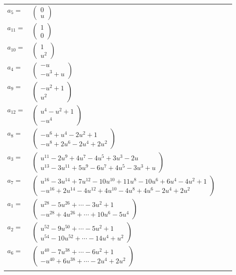 \documentclass[1p]{elsarticle_modified}
\theoremstyle{definition}
\begin{document}
\begin{tabular}{m{7pt} m{180pt} m{7pt} m{180pt} }
\flushright $a_{5}=$&$\begin{pmatrix}0\\u\end{pmatrix}$ \\
\flushright $a_{11}=$&$\begin{pmatrix}1\\0\end{pmatrix}$ \\
\flushright $a_{10}=$&$\begin{pmatrix}1\\u^2\end{pmatrix}$ \\
\flushright $a_{4}=$&$\begin{pmatrix}- u\\- u^3+u\end{pmatrix}$ \\
\flushright $a_{9}=$&$\begin{pmatrix}- u^2+1\\u^2\end{pmatrix}$ \\
\flushright $a_{12}=$&$\begin{pmatrix}u^4- u^2+1\\- u^4\end{pmatrix}$ \\
\flushright $a_{8}=$&$\begin{pmatrix}- u^6+u^4-2 u^2+1\\- u^8+2 u^6-2 u^4+2 u^2\end{pmatrix}$ \\
\flushright $a_{3}=$&$\begin{pmatrix}u^{11}-2 u^9+4 u^7-4 u^5+3 u^3-2 u\\u^{13}-3 u^{11}+5 u^9-6 u^7+4 u^5-3 u^3+u\end{pmatrix}$ \\
\flushright $a_{7}=$&$\begin{pmatrix}u^{16}-3 u^{14}+7 u^{12}-10 u^{10}+11 u^8-10 u^6+6 u^4-4 u^2+1\\- u^{16}+2 u^{14}-4 u^{12}+4 u^{10}-4 u^8+4 u^6-2 u^4+2 u^2\end{pmatrix}$ \\
\flushright $a_{1}=$&$\begin{pmatrix}u^{28}-5 u^{26}+\cdots-3 u^2+1\\- u^{28}+4 u^{26}+\cdots+10 u^6-5 u^4\end{pmatrix}$ \\
\flushright $a_{2}=$&$\begin{pmatrix}u^{52}-9 u^{50}+\cdots-5 u^2+1\\u^{54}-10 u^{52}+\cdots-14 u^4+u^2\end{pmatrix}$ \\
\flushright $a_{6}=$&$\begin{pmatrix}u^{40}-7 u^{38}+\cdots-6 u^2+1\\- u^{40}+6 u^{38}+\cdots-2 u^4+2 u^2\end{pmatrix}$\\&\end{tabular}
\end{document}
